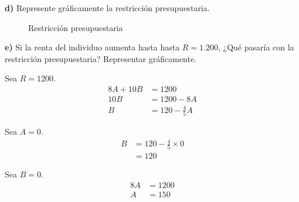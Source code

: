 \documentclass{templateNote}
\begin{document}
\textbf{d)} Represente gráficamente la restricción presupuestaria.

\begin{figure}[H]
    \centering
    \caption{Restricción presupuestaria}
\end{figure}

\newpage
\textbf{e)} Si la renta del individuo aumenta hasta hasta $R = 1.200$, ¿Qué pasaría con la
restricción presupuestaria? Representar gráficamente.

Sea $R = 1200$.
\begin{align*}
    8A + 10B &= 1200 \\
    10B &= 1200 - 8A \\
    B &= 120 - \frac{4}{5}A
\end{align*}

Sea $A = 0$.
\begin{align*}
    B &= 120 - \frac{4}{5} \times 0 \\
    &= 120
\end{align*}

Sea $B = 0$.
\begin{align*}
    8A &= 1200 \\
    A &= 150
\end{align*}
\end{document}
